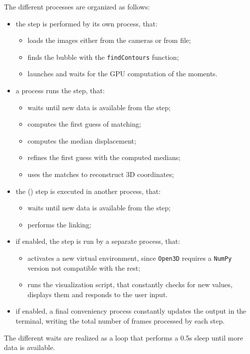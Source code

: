 The different processes are organized as follows:
\begin{itemize}
	\item the \locate* step is performed by its own process, that:
	      \begin{itemize}[topsep=0pt]
		      \itemsep 0em
		      \item loads the images either from the cameras or from file;
		      \item finds the bubble with the \texttt{findContours} function;
		      \item launches and waits for the GPU computation of the moments.
	      \end{itemize}
	\item a process runs the \match* step, that:
	      \begin{itemize}[topsep=0pt]
		      \itemsep 0em
		      \item waits until new data is available from the \locate* step;
		      \item computes the first guess of matching;
		      \item computes the median displacement;
		      \item refines the first guess with the computed medians;
		      \item uses the matches to reconstruct 3D coordinates;
	      \end{itemize}
	\item the \link* (\linkDDD*) step is executed in another process, that:
	      \begin{itemize}[topsep=0pt]
		      \itemsep 0em
		      \item waits until new data is available from the \match* step;
		      \item performs the linking;
	      \end{itemize}
	\item if enabled, the \visual* step is run by a separate process, that:
	      \begin{itemize}[topsep=0pt]
		      \itemsep 0em
		      \item activates a new virtual environment, since \texttt{Open3D} requires a \texttt{NumPy} version not compatible with the rest;
		      \item runs the visualization script, that constantly checks for new values, displays them and responds to the user input.
	      \end{itemize}
	\item if enabled, a final conveniency process constantly updates the output in the terminal, writing the total number of frames processed by each step.
\end{itemize}
The different waits are realized as a loop that performs a 0.5s sleep until more data is available.
